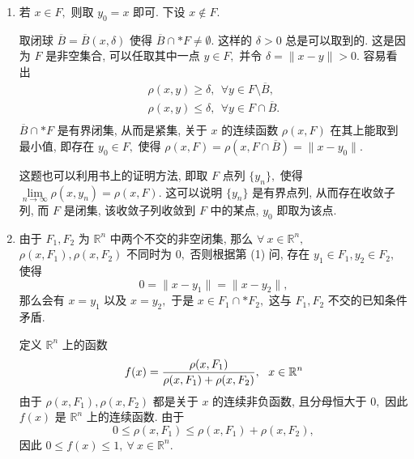 \begin{solution}
\begin{enumerate}
\item 若 $x \in F,$ 则取 $y_0 = x$ 即可. 下设 $x \not\in F$.

取闭球 $\overline{B} = \overline{B}(x, \delta)$ 使得 $\overline{B} \cap* F \neq \emptyset.$ 这样的 $\delta > 0$ 总是可以取到的. 这是因为 $F$ 是非空集合, 可以任取其中一点 $y \in F,$ 并令 $\delta = \lVert x - y \rVert > 0.$ 容易看出
\begin{equation*}
\begin{gathered}
\rho(x, y) \geqslant \delta, ~~ \forall y \in F \setminus \overline{B}, \\
\rho(x, y) \leqslant \delta, ~~ \forall y \in F \cap \overline{B}. \\
\end{gathered}
\end{equation*}
$\overline{B} \cap* F$ 是有界闭集, 从而是紧集, 关于 $x$ 的连续函数 $\rho(x, F)$ 在其上能取到最小值, 即存在 $y_0 \in F,$ 使得 $\rho(x, F) = \rho(x, F \cap \overline{B}) = \lVert x - y_0 \rVert.$ 

这题也可以利用书上的证明方法, 即取 $F$ 点列 $\{y_n\},$ 使得 $\lim\limits_{n\to\infty} \rho(x, y_n) = \rho(x, F).$ 这可以说明 $\{y_n\}$ 是有界点列, 从而存在收敛子列, 而 $F$ 是闭集, 该收敛子列收敛到 $F$ 中的某点, $y_0$ 即取为该点.

\item 由于 $F_1, F_2$ 为 $\mathbb{R}^n$ 中两个不交的非空闭集, 那么 $\forall ~ x \in \mathbb{R}^n,$ $\rho(x, F_1), \rho(x, F_2)$ 不同时为 $0,$ 否则根据第 (1) 问, 存在 $y_1 \in F_1, y_2 \in F_2,$ 使得
$$0 = \lVert x - y_1 \rVert = \lVert x - y_2 \rVert,$$
那么会有 $x = y_1$ 以及 $x = y_2,$ 于是 $x \in F_1 \cap* F_2,$ 这与 $F_1, F_2$ 不交的已知条件矛盾.

定义 $\mathbb{R}^n$ 上的函数
\begin{equation*}
f(x) = \dfrac{\rho(x, F_1)}{\rho(x, F_1) + \rho(x, F_2)}, ~~ x \in \mathbb{R}^n \score{5}
\end{equation*}
由于 $\rho(x, F_1), \rho(x, F_2)$ 都是关于 $x$ 的连续非负函数, 且分母恒大于 $0,$ 因此$f(x)$ 是 $\mathbb{R}^n$ 上的连续函数. 由于
$$0 \leqslant \rho(x, F_1) \leqslant \rho(x, F_1) + \rho(x, F_2),$$
因此 $0 \leqslant f(x) \leqslant 1, ~ \forall ~ x \in \mathbb{R}^n.$


\end{enumerate}
\end{solution}
